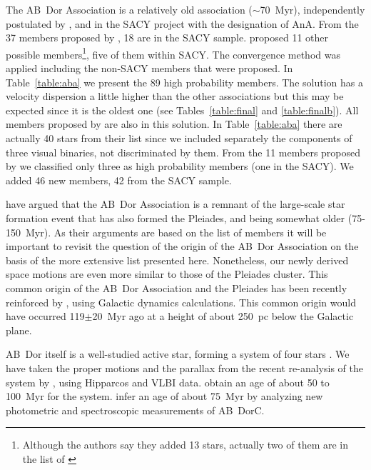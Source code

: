 \documentclass[11pt,twoside]{book}
\begin{document}
The AB~Dor Association is a relatively old association ($\sim$70~Myr),
independently postulated by \citet{zucksb04}, and in the SACY project
\citep{torres03a, torres03} with the designation of AnA.  From the 37
members proposed by \citet{zucksb04}, 18 are in the SACY sample.
\citet{lopez06} proposed 11 other possible members\footnote{Although
the authors say they added 13 stars, actually two of them are in the
list of \citet{zucksb04}}, five of them within SACY.  The convergence
method was applied including the non-SACY members that were proposed.
In Table~\ref{table:aba} we present the 89 high probability members.
The solution has a velocity dispersion a little higher than the other
associations but this may be expected since it is the oldest one (see
Tables~\ref{table:final} and \ref{table:finalb}).  All members
proposed by \citet{zucksb04} are also in this solution.  In
Table~\ref{table:aba} there are actually 40 stars from their list
since we included separately the components of three visual binaries,
not discriminated by them.  From the 11 members proposed by
\citet{lopez06} we classified only three as high
probability members (one in the SACY).  We added 46 new members, 42
from the SACY sample.

\citet{luhman05} have argued  that the  AB~Dor Association is a remnant of the large-scale star
formation event that has also formed the Pleiades, and being somewhat older (75-150~Myr).
As their arguments are based on the \citet{zucksb04} list of members it will be important
to revisit the question of the origin of the AB~Dor Association on the basis of
the more extensive list presented here.
Nonetheless, our newly derived space motions are even more similar to those of the Pleiades cluster.
This common origin of the  AB~Dor Association and the Pleiades has been recently reinforced by \citet{ortega07},
using Galactic dynamics calculations.
This common origin would have occurred 119$\pm$20~Myr ago
at a height of about 250~pc below the Galactic plane.

AB~Dor itself is a well-studied active star, forming a system of four stars \citep{close05}.
We have taken the  proper motions and the parallax from the recent re-analysis
of the system by  \citet{guirado06}, using Hipparcos and VLBI data.
\citet{janson07} obtain an age of about 50 to 100~Myr for the system.
\citet{close07}  infer an age of about 75~Myr by analyzing new photometric
and spectroscopic measurements of AB~DorC.
\end{document}
